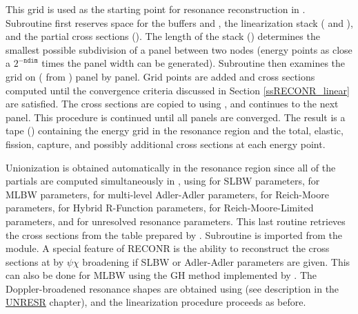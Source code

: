 This grid is used as the starting point for resonance
reconstruction in .
Subroutine  first reserves space for the
 buffers 
and , the linearization stack ( and
), and the partial cross sections ().  The
length of the stack () determines the smallest
possible subdivision of a panel between two nodes (energy points
as close a $2^{-{\mathtt{ndim}}}$ times the panel width can be
generated).  Subroutine  then examines the grid on
 ( from
) panel by panel.
Grid points are added and cross sections computed until the
convergence criteria discussed in Section \ref{ssRECONR_linear} are
satisfied.  The cross sections are copied to  using
, and  continues to the next panel.  This
procedure is continued until all panels are converged.  The result is a tape
() containing the energy grid in the resonance region
and the total, elastic, fission, capture, and possibly additional
cross sections at each energy point.

Unionization is obtained automatically in the resonance region
since all of the partials are computed simultaneously in
, using
 for SLBW parameters, 
for MLBW  parameters,
 for multi-level Adler-Adler
 parameters,
 for Reich-Moore
 parameters,
 for Hybrid R-Function
 parameters,
 for
Reich-Moore-Limited parameters,
and  for
unresolved resonance parameters.  This last routine retrieves
the cross sections from the table prepared by
.  Subroutine
 is imported from the 
module.  A special feature
of RECONR is the ability to reconstruct
the cross sections at  by $\psi\chi$
broadening
if SLBW
or Adler-Adler parameters are given.  This can also be done
for MLBW using the GH
method implemented
by .  The
Doppler-broadened resonance shapes are obtained using
 (see description in
the \hyperlink{sUNRESRhy}{UNRESR} chapter), and
the linearization procedure proceeds as before.

